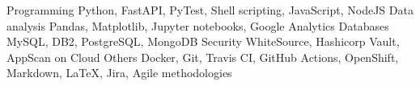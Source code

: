 %
%
%

    \begin{keywords}
        \keywordsentry
            {Programming}
            {
                Python,
                FastAPI,
                PyTest,
                Shell scripting,
                JavaScript,
                NodeJS
            }
        \keywordsentry
            {Data analysis}
            {
                Pandas,
                Matplotlib,
                Jupyter notebooks,
                Google Analytics
            }
        \keywordsentry
            {Databases}
            {
                MySQL,
                DB2,
                PostgreSQL,
                MongoDB
            }
        \keywordsentry
            {Security}
            {
                WhiteSource,
                Hashicorp Vault,
                AppScan on Cloud
            }
        \keywordsentry
            {Others}
            {
            	Docker,
                Git,
                Travis CI,
                GitHub Actions,
                OpenShift,
                Markdown,
                \LaTeX,
                Jira,
                Agile methodologies
            }
    \end{keywords}
